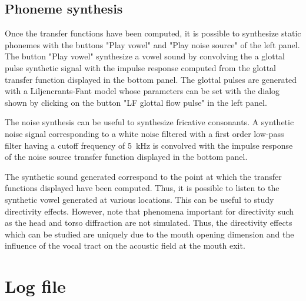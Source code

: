 \documentclass[]{article}
\begin{document}
	\subsection{Phoneme synthesis}
	
	Once the transfer functions have been computed, it is possible to synthesize 
	static phonemes with the buttons "Play vowel" and "Play noise source" of the left panel.
	The button "Play vowel" synthesize a vowel sound by convolving the a glottal pulse
	synthetic signal with the impulse response computed from the glottal transfer function
	displayed in the bottom panel. 
	The glottal pulses are generated with a Liljencrants-Fant model \cite{fant1985four}
	whose parameters can be set with the dialog shown by clicking on the button 
	"LF glottal flow pulse" in the left panel.
	
	The noise synthesis can be useful to synthesize fricative consonants.
	A synthetic noise signal corresponding to a white noise filtered with a first order 
	low-pass filter having a cutoff frequency of 5~kHz is convolved with the 
	impulse response of the noise source transfer function displayed in the bottom panel.
	
	The synthetic sound generated correspond to the point at which the transfer functions
	displayed have been computed.
	Thus, it is possible to listen to the synthetic vowel generated at various locations.
	This can be useful to study directivity effects.
	However, note that phenomena important for directivity such as the head and torso
	diffraction are not simulated. Thus, the directivity effects which can be studied 
	are uniquely due to the mouth opening dimension and the influence of the vocal tract
	on the acoustic field at the mouth exit.
	
	\section{Log file}
	
\end{document}
